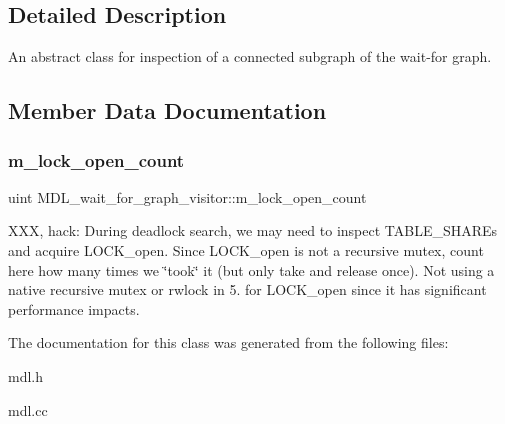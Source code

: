 \subsection{Detailed Description}
An abstract class for inspection of a connected subgraph of the wait-\/for graph. 

\subsection{Member Data Documentation}
\mbox{\label{classMDL__wait__for__graph__visitor_ad2e6efb3798e08ce8efa992b0ccbba38}} 
\subsubsection{\texorpdfstring{m\+\_\+lock\+\_\+open\+\_\+count}{m\_lock\_open\_count}}
{\footnotesize\ttfamily uint M\+D\+L\+\_\+wait\+\_\+for\+\_\+graph\+\_\+visitor\+::m\+\_\+lock\+\_\+open\+\_\+count}

X\+XX, hack\+: During deadlock search, we may need to inspect T\+A\+B\+L\+E\+\_\+\+S\+H\+A\+R\+Es and acquire L\+O\+C\+K\+\_\+open. Since L\+O\+C\+K\+\_\+open is not a recursive mutex, count here how many times we \char`\"{}took\char`\"{} it (but only take and release once). Not using a native recursive mutex or rwlock in 5. for L\+O\+C\+K\+\_\+open since it has significant performance impacts. 

The documentation for this class was generated from the following files\+:\begin{DoxyCompactItemize}
\item 
mdl.\+h\item 
mdl.\+cc\end{DoxyCompactItemize}
